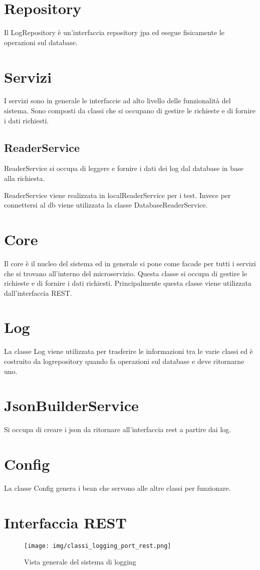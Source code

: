 \section{Repository}
Il LogRepository è un'interfaccia repository jpa ed esegue fisicamente le operazioni sul database.

\section{Servizi}

I servizi sono in generale le interfaccie ad alto livello delle funzionalità del sistema. Sono composti da classi che si occupano di gestire le richieste e di fornire i dati richiesti.

\subsection{ReaderService}
ReaderService si occupa di leggere e fornire i dati dei log dal database in base alla richiesta.

ReaderService viene realizzata in localReaderService per i test. Invece per connettersi al db viene utilizzata la classe DatabaseReaderService.

\section{Core}
Il core è il nucleo del sistema ed in generale si pone come facade per tutti i servizi che si trovano all'interno del microservizio. Questa classe si occupa di gestire le richieste e di fornire i dati richiesti.
Principalmente questa classe viene utilizzata dall'interfaccia REST.

\section{Log}
La classe Log viene utilizzata per trasferire le informazioni tra le varie classi ed è costruito da logrepository quando fa operazioni sul database e deve ritornarne uno.

\section{JsonBuilderService}
Si occupa di creare i json da ritornare all'interfaccia rest a partire dai log.

\section{ Config}
La classe Config genera i bean che servono alle altre classi per funzionare.



\section{Interfaccia REST}

\begin{figure}[ht]
    \centering
    \texttt{[image: img/classi\_logging\_port\_rest.png]}
    \caption{Vista generale del sistema di logging}
    \label{fig:general_logging}
\end{figure}


